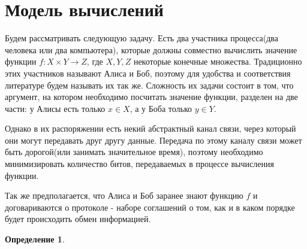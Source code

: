 \documentclass[12pt]{article}
\begin{document}
\tableofcontents
\newpage

\section{Модель вычислений}
\newtheorem{Def}{Определение}

Будем рассматривать следующую задачу.
Есть два участника процесса(два человека или два компьютера), которые должны совместно вычислить значение функции
$ f \colon X \times Y \rightarrow Z $, где $X, Y, Z$ некоторые конечные множества.
Традиционно этих участников называют Алиса и Боб,
поэтому для удобства и соответствия литературе будем называть их так же.
Сложность их задачи состоит в том, что аргумент, на котором необходимо посчитать значение функции, разделен на две части:
у Алисы есть только $x \in X$, а у Боба только $y \in Y$.

Однако в их распоряжении есть некий абстрактный канал связи, через который они могут передавать друг другу данные. Передача по этому каналу связи может быть дорогой(или занимать значительное время), поэтому необходимо минимизировать количество битов, передаваемых в процессе вычисления функции.

Так же предполагается, что Алиса и Боб заранее знают функцию $f$ и договариваются о протоколе -
наборе соглашений о том, как и в каком порядке будет происходить обмен информацией.

\begin{Def}

\end{Def}
\end{document}
